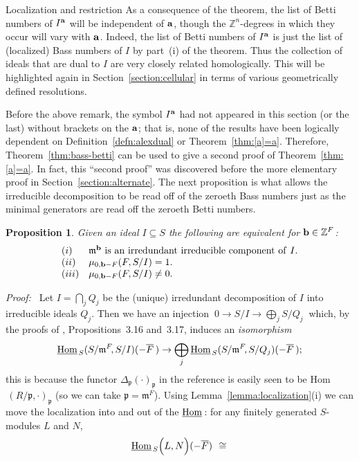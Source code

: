 \documentclass[12pt,leqno]{article}
\newtheorem{prop}[thm]{Proposition}
\def\hhom{{{\underline{\rm Hom}}{\scriptscriptstyle \,}}}
\def\aa{{{\rm \bf a}}}
\def\bb{{{\rm \bf b}}}
\def\mm{{\mathfrak m}}
\def\pp{{\mathfrak p}}
\def\ZZ{{\mathbb Z}}
\begin{document}
\begin{section}{Localization and restriction}
As a consequence of the theorem, the list of Betti numbers of $I^\aa$
will be independent of $\aa$, though the $\ZZ^n$-degrees in which they
occur will vary with $\aa$.  Indeed, the list of Betti numbers of $I^\aa$
is just the list of (localized) Bass numbers of $I$ by part~(i) of the
theorem.  Thus the collection of ideals that are dual to $I$ are very
closely related homologically.  This will be highlighted again in
Section~\ref{section:cellular} in terms of various geometrically defined
resolutions.

Before the above remark, the symbol $I^\aa$ had not appeared in this
section (or the last) without brackets on the $\aa$; that is, none of the
results have been logically dependent on Definition~\ref{defn:alexdual}
or Theorem~\ref{thm:[a]=a}.  Therefore, Theorem~\ref{thm:bass-betti} can
be used to give a second proof of Theorem~\ref{thm:[a]=a}.  In fact, this
``second proof'' was discovered before the more elementary proof in
Section~\ref{section:alternate}.  The next proposition is what allows the
irreducible decomposition to be read off of the zeroeth Bass numbers just
as the minimal generators are read off the zeroeth Betti numbers.
\begin{prop} \label{prop:zeroeth_bass}
Given an ideal $I \subseteq S$ the following are equivalent for $\bb \in
\ZZ^F$: 
$$
\begin{array}{ll}
(i)
&	\mm^{\bb}{\rm \ is\ an\ irredundant\ irreducible\
	component\ of\ } I. \cr 
(ii)
&	\mu_{0,\bb - F}(F,S/I) = 1. \cr
(iii)
&	\mu_{0,\bb - F}(F,S/I) \neq 0. \cr
\end{array}
$$
\end{prop}
{\it Proof:\ } Let $I = \bigcap_j Q_j$ be the (unique) irredundant
decomposition of $I$ into irreducible ideals $Q_j$.  Then we have an
injection $\ 0 \to S/I \to \bigoplus_j S/Q_j\ $ which, by the proofs of
\cite{Vas}, Propositions~3.16 and~3.17, induces an {\it isomorphism}
\begin{equation} \label{eqn:hom}
  \hhom_S (S/\mm^F\!,S/I)(-\overline{F}^{\,}) \to 
  \bigoplus_j \hhom_S (S/\mm^F\!,S/Q_j)(-\overline{F}^{\,});
\end{equation}
this is because the functor $\Delta_\pp(\cdot)_\pp$ in the \cite{Vas}
reference is easily seen to be Hom$_{\,}(R/\pp,\cdot)_\pp$ (so we can
take $\pp = \mm^F$).  Using Lemma~\ref{lemma:localization}(i) we can move
the localization into and out of the $\hhom$: for any finitely generated
$S$-modules $L$ and $N$,
$$
\begin{array}{r@{\ \ \protect\cong\ \ }l}
\hhom_S \Bigl( L,N \Bigr)(-{\overline F})

\end{array}$$
\end{section}
\end{document}
